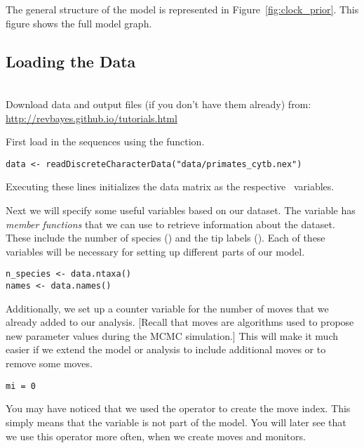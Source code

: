The general structure of the model is represented in Figure~\ref{fig:clock_prior}.
This figure shows the full model graph.


\bigskip

\subsection{Loading the Data}

\noindent \\ \impmark Download data and output files (if you don't have them already) from: \href{http://revbayes.github.io/tutorials.html}{http://revbayes.github.io/tutorials.html}

First load in the sequences using the  function. 
{\tt \begin{snugshade*}
\begin{lstlisting}
data <- readDiscreteCharacterData("data/primates_cytb.nex")
\end{lstlisting}
\end{snugshade*}}
Executing these lines initializes the data matrix as the respective \Rev~variables. 

Next we will specify some useful variables based on our dataset. The variable  has \textit{member functions} that we can use to retrieve information about the dataset. 
These include the number of species () and the tip labels ().
Each of these variables will be necessary for setting up different parts of our model.
{\tt \begin{snugshade*}
\begin{lstlisting}
n_species <- data.ntaxa()
names <- data.names()	
\end{lstlisting}
\end{snugshade*}}

Additionally, we set up a counter variable for the number of moves that we already added to our analysis.
[Recall that moves are algorithms used to propose new parameter values during the MCMC simulation.]
This will make it much easier if we extend the model or analysis to include additional moves or to remove some moves.
{\tt \begin{snugshade*}
\begin{lstlisting}
mi = 0 
\end{lstlisting}
\end{snugshade*}}
You may have noticed that we used the \cl{=} operator to create the move index.
This simply means that the variable is not part of the model.
You will later see that we use this operator more often, \EG when we create moves and monitors.

